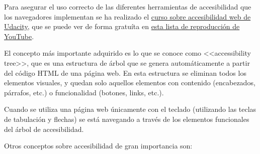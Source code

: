 Para asegurar el uso correcto de las diferentes herramientas de accesibilidad
que los navegadores implementan se ha realizado el
\href{https://www.udacity.com/course/web-accessibility--ud891}{curso sobre
accesibilidad web de Udacity}, que se puede ver de forma gratuíta en
\href{https://www.youtube.com/playlist?list=PLcJAkgdenpsci0IJziU4bCk3dTQLpJU7R}{esta
lista de reproducción de YouTube}.

El concepto más importante adquirido es lo que se conoce como <<accessibility
tree>>, que es una estructura de árbol que se genera automáticamente a partir
del código HTML de una página web. En esta estructura se eliminan todos los
elementos visuales, y quedan solo aquellos elementos con contenido (encabezados,
párrafos, etc.) o funcionalidad (botones, links, etc.).

Cuando se utiliza una página web únicamente con el teclado (utilizando las
teclas de tabulación y flechas) se está navegando a través de los elementos
funcionales del árbol de accesibilidad.

Otros conceptos sobre accesibilidad de gran importancia son:

